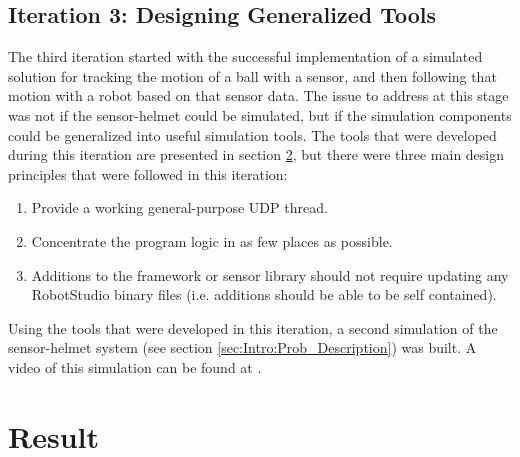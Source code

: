 \documentclass{cslthse-msc}
\begin{document}
\section{Iteration 3: Designing Generalized Tools}
\label{sec:Dev:I3}
The third iteration started with the successful implementation of a simulated solution for tracking the motion of a ball with a sensor, and then following that motion with a robot based on that sensor data. The issue to address at this stage was not if the sensor-helmet could be simulated, but if the simulation components could be generalized into useful simulation tools. The tools that were developed during this iteration are presented in section \ref{sec:Result}, but there were three main design principles that were followed in this iteration:
\begin{enumerate}
    \item Provide a working general-purpose UDP thread.
    \item Concentrate the program logic in as few places as possible.
    \item Additions to the framework or sensor library should not require updating any RobotStudio binary files (i.e. additions should be able to be self contained).
\end{enumerate}
Using the tools that were developed in this iteration, a second simulation of the sensor-helmet system (see section \ref{sec:Intro:Prob_Description}) was built. A video of this simulation can be found at \cite{Greg:Demo}.

%
%
%
%
%
%
%
%
%
%
\chapter{Result}
\label{sec:Result}
\end{document}
